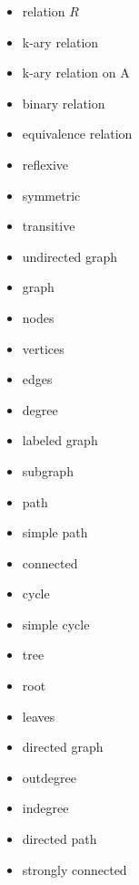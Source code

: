 \documentclass{article}
\begin{document}
\bigskip \indent
\begin{itemize}
\item relation $R$

\item k-ary relation

\item k-ary relation on A

\item binary relation

\item equivalence relation

\item reflexive

\item symmetric

\item transitive

\item undirected graph

\end{itemize}

\bigskip \indent
\begin{itemize}
\item graph

\item nodes

\item vertices

\item edges

\item degree

\item labeled graph

\item subgraph

\item path

\item simple path

\item connected

\item cycle

\item simple cycle

\item tree

\item root

\item leaves

\item directed graph

\item outdegree

\item indegree

\item directed path

\item strongly connected

\end{itemize}
   
\end{document}
